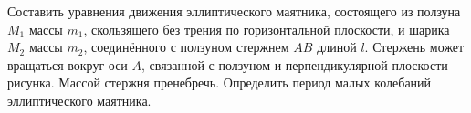 Составить уравнения движения эллиптического маятника,
состоящего из ползуна $M_1$ массы $m_1$,
скользящего без трения по горизонтальной плоскости,
и шарика $M_2$ массы $m_2$, соединённого с ползуном стержнем $AB$ длиной $l$.
Стержень может вращаться вокруг оси $A$, связанной с ползуном
и перпендикулярной плоскости рисунка.
Массой стержня пренебречь.
Определить период малых колебаний эллиптического маятника.
